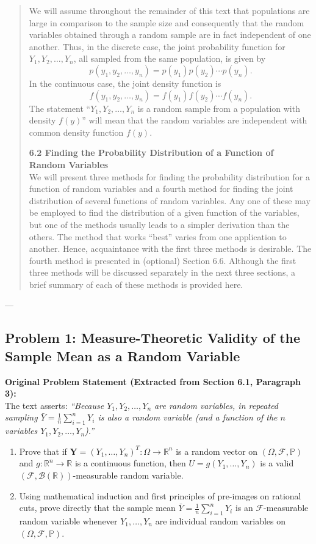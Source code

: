 \documentclass[11pt, letterpaper]{article}
\theoremstyle{definition}
\theoremstyle{remark}
\newcommand{\R}{\mathbb{R}}
\newcommand{\Prob}{\mathbb{P}}
\newcommand{\F}{\mathcal{F}}
\begin{document}
\begin{quote}
We will assume throughout the remainder of this text that populations are large in comparison to the sample size and consequently that the random variables obtained through a random sample are in fact independent of one another. Thus, in the discrete case, the joint probability function for $Y_1, Y_2, \dots, Y_n$, all sampled from the same population, is given by
\[
    p(y_1, y_2, \dots, y_n) = p(y_1)p(y_2)\cdots p(y_n).
\]
In the continuous case, the joint density function is
\[
    f(y_1, y_2, \dots, y_n) = f(y_1)f(y_2)\cdots f(y_n).
\]
The statement ``$Y_1, Y_2, \dots, Y_n$ is a random sample from a population with density $f(y)$'' will mean that the random variables are independent with common density function $f(y)$.

\textbf{6.2 Finding the Probability Distribution of a Function of Random Variables} \\ \relax
We will present three methods for finding the probability distribution for a function of random variables and a fourth method for finding the joint distribution of several functions of random variables. Any one of these may be employed to find the distribution of a given function of the variables, but one of the methods usually leads to a simpler derivation than the others. The method that works ``best'' varies from one application to another. Hence, acquaintance with the first three methods is desirable. The fourth method is presented in (optional) Section 6.6. Although the first three methods will be discussed separately in the next three sections, a brief summary of each of these methods is provided here.
\end{quote}

---

\subsection{Problem 1: Measure-Theoretic Validity of the Sample Mean as a Random Variable}

\textbf{Original Problem Statement (Extracted from Section 6.1, Paragraph 3):} \\ \relax
The text asserts: \emph{``Because $Y_1, Y_2, \dots, Y_n$ are random variables, in repeated sampling $\bar{Y} = \frac{1}{n}\sum_{i=1}^n Y_i$ is also a random variable (and a function of the $n$ variables $Y_1, Y_2, \dots, Y_n$).''}
\begin{enumerate}[label=(\alph*)]
    \item Prove that if $\mathbf{Y} = (Y_1, \dots, Y_n)^T : \Omega \to \R^n$ is a random vector on $(\Omega, \F, \Prob)$ and $g : \R^n \to \R$ is a continuous function, then $U = g(Y_1, \dots, Y_n)$ is a valid $(\F, \mathcal{B}(\R))$-measurable random variable.
    \item Using mathematical induction and first principles of pre-images on rational cuts, prove directly that the sample mean $\bar{Y} = \frac{1}{n}\sum_{i=1}^n Y_i$ is an $\F$-measurable random variable whenever $Y_1, \dots, Y_n$ are individual random variables on $(\Omega, \F, \Prob)$.
\end{enumerate}
\end{document}
